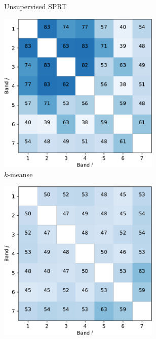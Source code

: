 \documentclass{article}
\begin{document}
\begin{figure}[h]
\begin{subfigure}[b]{0.49\linewidth}
    \caption{Unsupervised SPRT} 
    \label{fig7:b} 
    \end{subfigure} 
  \begin{subfigure}[b]{0.49\linewidth}
    \centering
    \includegraphics[width=0.85\textwidth]{kmeans-crop.pdf} 
    \caption{$k$-meanse} 
    \label{fig7:c} 
  \end{subfigure}%
  \begin{subfigure}[b]{0.49\linewidth}
    \centering
    \includegraphics[width=0.85\textwidth]{gmm-crop.pdf} 

\end{subfigure}
\end{figure}
\end{document}
